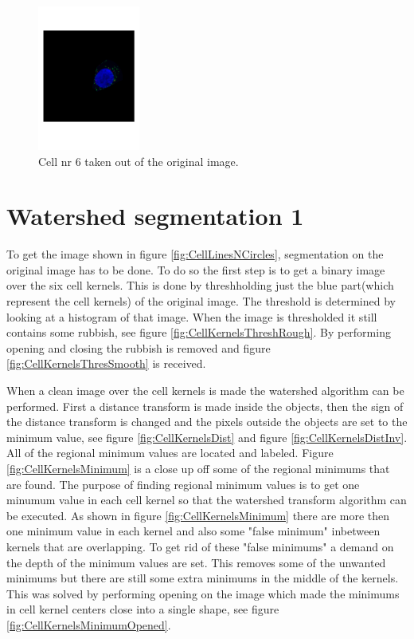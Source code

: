 \documentclass[10pt,twocolumn]{article}
\begin{document}
\begin{figure}[ht]
\centering
\includegraphics[width=0.3\textwidth]{Bilder/CellPart.pdf}
\caption{Cell nr 6 taken out of the original image.}
\label{fig:CellPart}
\end{figure}

%
%

\section{Watershed segmentation 1} \label{sec:WatSeg1}
To get the image shown in figure \ref{fig:CellLinesNCircles}, segmentation
on the original image has to be done. To do so the first step is to get a binary image over the
six cell kernels. This is done by threshholding just the blue part(which represent the cell kernels)  of the original image. The threshold is determined by looking at
a histogram of that image. When the image is thresholded it still
contains some rubbish, see figure \ref{fig:CellKernelsThreshRough}. By performing
opening and closing the rubbish is removed and figure \ref{fig:CellKernelsThresSmooth} is received.

When a clean image over the cell kernels is made the watershed algorithm can be performed.
First a distance transform is made inside the objects, then the sign
of the distance transform is changed and the pixels outside the objects are set
to the minimum value, see figure \ref{fig:CellKernelsDist} and figure \ref{fig:CellKernelsDistInv}. All of the regional minimum values
are located and labeled. Figure \ref{fig:CellKernelsMinimum} is a close up off some of the regional minimums that are found.
The purpose of finding regional minimum values is to get one minumum value in each cell kernel so that
the watershed transform algorithm can be executed. As shown in figure \ref{fig:CellKernelsMinimum} there are
more then one minimum value in each kernel and also some "false minimum" inbetween kernels that are overlapping.
To get rid of these "false minimums" a demand on the depth of the minimum values are set. This removes some of the unwanted
minimums but there are still some extra minimums in the middle of the kernels. This
was solved by performing opening on the image which made the minimums in cell kernel centers close into a single shape,
see figure \ref{fig:CellKernelsMinimumOpened}.
\end{document}

